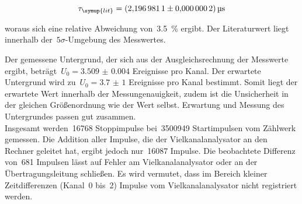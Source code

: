 \begin{equation}
  \tau_{\symup{lit}}=\SI{2.1969811(2)}{\micro\second}
\end{equation}

woraus sich eine relative Abweichung von~\SI{3.5}{\percent} ergibt. Der
Literaturwert liegt innerhalb der~$5\sigma$-Umgebung des Messwertes.

Der gemessene Untergrund, der sich aus der Ausgleichsrechnung der Messwerte
ergibt, beträgt~$U_0=\num{3.509(4)}$ Ereignisse pro Kanal. Der erwartete
Untergrund wird zu~$U_0=\num{3.7(10)}$ Ereignisse pro Kanal bestimmt.
Somit liegt der erwartete Wert innerhalb der Messungenauigkeit, zudem ist die
Unsicherheit in der gleichen Größenordnung wie der Wert selbst. Erwartung und Messung
des Untergrundes passen gut zusammen.\\
Insgesamt werden~\num{16768} Stoppimpulse bei~\num{3500949} Startimpulsen
vom Zählwerk gemessen. Die Addition aller Impulse, die der Vielkanalanalysator
an den Rechner geleitet hat, ergibt jedoch nur~\num{16087} Impulse. Die
beobachtete Differenz von~\num{681} Impulsen lässt auf Fehler am
Vielkanalanalysator oder an der Übertragungsleitung schließen. Es wird vermutet,
dass im Bereich kleiner Zeitdifferenzen (Kanal~\num{0} bis~\num{2})
Impulse vom Vielkanalanalysator nicht registriert werden.

